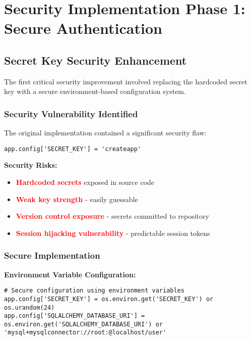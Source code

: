\documentclass[12pt,a4paper]{article}
\begin{document}
\section{Security Implementation Phase 1: Secure Authentication}

\subsection{Secret Key Security Enhancement}

The first critical security improvement involved replacing the hardcoded secret key with a secure environment-based configuration system.

\subsubsection{Security Vulnerability Identified}
The original implementation contained a significant security flaw:

\begin{lstlisting}[caption=Original Insecure Configuration]
app.config['SECRET_KEY'] = 'createapp'
\end{lstlisting}

\textbf{Security Risks:}
\begin{itemize}
    \item \textcolor{red}{\textbf{Hardcoded secrets}} exposed in source code
    \item \textcolor{red}{\textbf{Weak key strength}} - easily guessable
    \item \textcolor{red}{\textbf{Version control exposure}} - secrets committed to repository
    \item \textcolor{red}{\textbf{Session hijacking vulnerability}} - predictable session tokens
\end{itemize}

\subsubsection{Secure Implementation}

\textbf{Environment Variable Configuration:}
\begin{lstlisting}[caption=Secure Secret Key Implementation]
# Secure configuration using environment variables
app.config['SECRET_KEY'] = os.environ.get('SECRET_KEY') or os.urandom(24)
app.config['SQLALCHEMY_DATABASE_URI'] = os.environ.get('SQLALCHEMY_DATABASE_URI') or 'mysql+mysqlconnector://root:@localhost/user'
\end{lstlisting}
\end{document}
